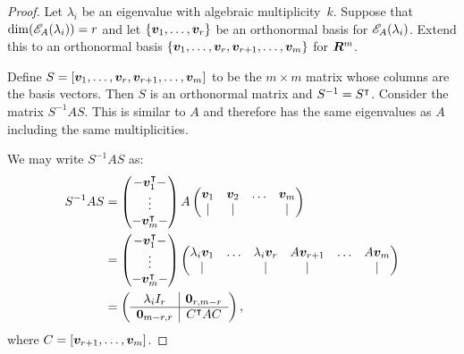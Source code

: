 \begin{proof}
Let $\lambda_i$ be an eigenvalue with algebraic multiplicity~$k$.  Suppose that
$\dim(\mathscr{E}_{A}(\lambda_i)) = r$ and let $\{\boldsymbol{v}_1, \ldots, \boldsymbol{v}_r\}$ be an
orthonormal basis for $\mathscr{E}_{A}(\lambda_i)$.  Extend this to an
orthonormal basis $\{\boldsymbol{v}_1, \ldots, \boldsymbol{v}_r, \boldsymbol{v}_{r + 1}, \ldots, \boldsymbol{v}_m\}$ 
for $\bm{R}^m$. 

Define $S = [\boldsymbol{v}_1, \ldots, \boldsymbol{v}_r, \boldsymbol{v}_{r + 1}, \ldots, \boldsymbol{v}_m]$ 
to be the $m \times m$ matrix whose columns are the basis vectors. 
Then $S$ is an orthonormal matrix and $S^{-1} = S^{\intercal}$. Consider the 
matrix $S^{-1} A S$. This is similar to $A$ and therefore has the 
same eigenvalues as $A$ including the same multiplicities. 

We may write $S^{-1} A S$ as:
\begin{align*}
    S^{-1} A S & = \begin{pmatrix} 
                        -\boldsymbol{v}_1^{\intercal}- \\
                         \vdots \\
                        -\boldsymbol{v}_m^{\intercal}- 
                   \end{pmatrix} 
                   A 
                   \begin{pmatrix}
                    \boldsymbol{v}_1 & \boldsymbol{v}_2 & \ldots & \boldsymbol{v}_m \\
                        |      &    |       &        &    |       
                   \end{pmatrix} \\
              & = \begin{pmatrix} 
                        -\boldsymbol{v}_1^{\intercal}- \\
                         \vdots \\
                        -\boldsymbol{v}_m^{\intercal}- 
                   \end{pmatrix} 
                   \begin{pmatrix}
                    \lambda_i \boldsymbol{v}_1 & \ldots & \lambda_i \boldsymbol{v}_r & A \boldsymbol{v}_{r + 1} & \ldots & A \boldsymbol{v}_m \\
                            |          &        &         |          &          |         &        &     |
                   \end{pmatrix} \\
             & = \left ( \begin{array}{c|c}
                    \lambda_i I_r         & \boldsymbol{0}_{r, m - r} \\ \hline
                    \boldsymbol{0}_{m - r, r} & C^{\intercal} A C 
                 \end{array} \right ),
\end{align*}
where $C = [\boldsymbol{v}_{r + 1}, \ldots, \boldsymbol{v}_m]$. 
\end{proof}
